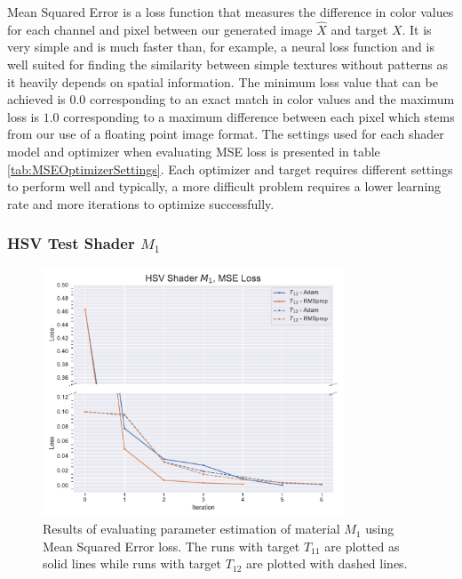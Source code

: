 Mean Squared Error is a loss function that measures the difference in color values for each channel and pixel between our generated image $\hat{X}$ and target $X$. It is very simple and is much faster than, for example, a neural loss function and is well suited for finding the similarity between simple textures without patterns as it heavily depends on spatial information. The minimum loss value that can be achieved is $0.0$ corresponding to an exact match in color values and the maximum loss is $1.0$ corresponding to a maximum difference between each pixel which stems from our use of a floating point image format. The settings used for each shader model and optimizer when evaluating MSE loss is presented in table \ref{tab:MSEOptimizerSettings}. Each optimizer and target requires different settings to perform well and typically, a more difficult problem requires a lower learning rate and more iterations to optimize successfully.

\subsubsection{HSV Test Shader $M_1$}

\begin{figure}
    \centering
    \includegraphics[width=0.8\textwidth]{img/evaluation/M1/HSV_MSE.pdf}
    \caption{Results of evaluating parameter estimation of material $M_1$ using Mean Squared Error loss. The runs with target $T_{11}$ are plotted as solid lines while runs with target $T_{12}$ are plotted with dashed lines.}
    \label{fig:M1MSEData}
\end{figure}

